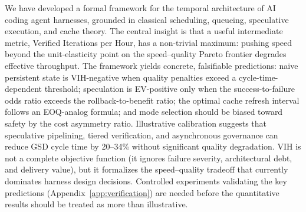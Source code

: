 \documentclass[11pt, a4paper, copyright]{googledeepmind}
\begin{document}
We have developed a formal framework for the temporal architecture of AI coding agent harnesses, grounded in classical scheduling, queueing, speculative execution, and cache theory. The central insight is that a useful intermediate metric, Verified Iterations per Hour, has a non-trivial maximum: pushing speed beyond the unit-elasticity point on the speed--quality Pareto frontier degrades effective throughput. The framework yields concrete, falsifiable predictions: naive persistent state is VIH-negative when quality penalties exceed a cycle-time-dependent threshold; speculation is EV-positive only when the success-to-failure odds ratio exceeds the rollback-to-benefit ratio; the optimal cache refresh interval follows an EOQ-analog formula; and mode selection should be biased toward safety by the cost asymmetry ratio. Illustrative calibration suggests that speculative pipelining, tiered verification, and asynchronous governance can reduce GSD cycle time by 20--34\% without significant quality degradation. VIH is not a complete objective function (it ignores failure severity, architectural debt, and delivery value), but it formalizes the speed--quality tradeoff that currently dominates harness design decisions. Controlled experiments validating the key predictions (Appendix~\ref{app:verification}) are needed before the quantitative results should be treated as more than illustrative.
\end{document}
